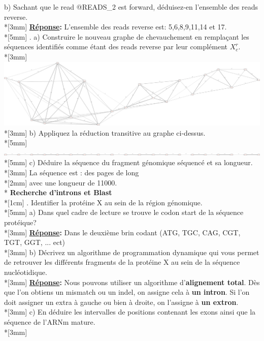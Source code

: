 \documentclass[11pt, letterpaper]{article}
\begin{document}
{b) Sachant que le read @READS\_2 est forward, déduisez-en l'ensemble des reads reverse. \\*[3mm]
\textbf{\underline{Réponse}:} L'ensemble des reads reverse est: 5,6,8,9,11,14 et 17. \\*[5mm]
. a) Construire le nouveau graphe de chevauchement en remplaçant les séquences identifiés comme étant des reads reverse par leur complément $X^r_c$. \\*[3mm]
\includegraphics[width=\textwidth]{Images/Assemblage_no3_a).png} \\*[3mm]
b) Appliquez la réduction transitive au graphe ci-dessus. \\*[5mm]
\includegraphics[width=\textwidth]{Images/graphe_final.png} \\*[5mm]
c) Déduire la séquence du fragment génomique séquencé et sa longueur. \\*[3mm]
La séquence est : des pages de long \\*[2mm]
avec une longueur de 11000. \\*
\newpage
\textbf{Recherche d'introns et Blast} \\*[1cm]
. Identifier la protéine X au sein de la région génomique. \\*[5mm]
a) Dans quel cadre de lecture se trouve le codon start de la séquence protéique? \\*[3mm]
\textbf{\underline{Réponse}:} Dans le deuxième brin codant (ATG, TGC, CAG, CGT, TGT, GGT, ... ect) \\*[3mm]
b) Décrivez un algorithme de programmation dynamique qui vous permet de retrouver les différents fragments de la protéine X au sein de la séquence nucléotidique. \\*[3mm]
\textbf{\underline{Réponse}:} Nous pouvons utiliser un algorithme d'\textbf{alignement total}. Dès que l'on obtiens un mismatch ou un indel, on assigne cela à \textbf{un intron}. Si l'on doit assigner un extra à gauche ou bien à droite, on l'assigne à \textbf{un extron}. \\*[3mm]
c) En déduire les intervalles de positions contenant les exons ainsi que la séquence de l'ARNm mature. \\*[3mm]
}
\end{document}
